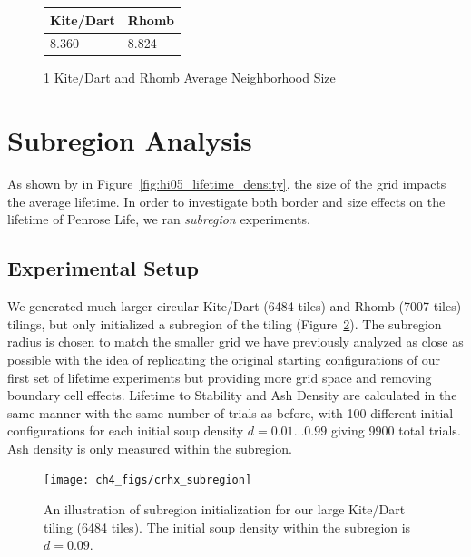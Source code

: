 \documentclass[a4paper,11pt]{report}
\begin{document}
\begin{figure}[htp]
\centering
\begin{tabular}{| l | l |}
\hline
Kite/Dart & Rhomb \\
\hline
8.360 & 8.824 \\
\hline
\end{tabular}
\caption[Kite/Dart and Rhomb Average Neighborhood Size]{
1	Kite/Dart and Rhomb Average Neighborhood Size
}
\label{tbl:avg_nbd}
\end{figure}

\section{Subregion Analysis}

As shown by \citeauthor{hi05} in Figure~\ref{fig:hi05_lifetime_density}, the size of the grid impacts the average lifetime. In order to investigate both border and size effects on the lifetime of Penrose Life, we ran \textit{subregion} experiments.

\subsection*{Experimental Setup}
We generated much larger circular Kite/Dart (6484 tiles) and Rhomb (7007 tiles) tilings, but only initialized a subregion of the tiling (Figure~\ref{fig:crhx_sub_init}). The subregion radius is chosen to match the smaller grid we have previously analyzed as close as possible with the idea of replicating the original starting configurations of our first set of lifetime experiments but providing more grid space and removing boundary cell effects. Lifetime to Stability and Ash Density are calculated in the same manner with the same number of trials as before, with 100 different initial configurations for each initial soup density $d=0.01...0.99$ giving 9900 total trials. Ash density is only measured within the subregion.

\begin{figure}[htp]
\centering
\texttt{[image: ch4\_figs/crhx\_subregion]}
\caption[Rhomb Subregion Initialization]{
	An illustration of subregion initialization for our large Kite/Dart tiling (6484 tiles). The initial soup density within the subregion is $d=0.09$.
}
\label{fig:crhx_sub_init}
\end{figure}
\end{document}
